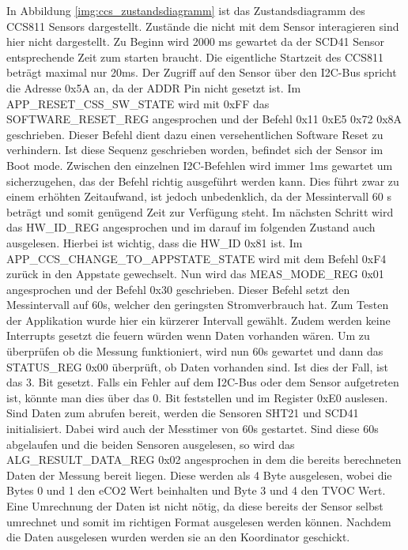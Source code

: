 \documentclass[]{article}
\begin{document}
			In Abbildung \ref{img:ccs_zustandsdiagramm} ist das Zustandsdiagramm des CCS811 Sensors dargestellt. Zustände die nicht mit dem Sensor interagieren sind hier nicht dargestellt. Zu Beginn wird 2000 ms gewartet da der SCD41 Sensor entsprechende Zeit zum starten braucht. Die eigentliche Startzeit des CCS811 beträgt maximal nur 20ms. Der Zugriff auf den Sensor über den I2C-Bus spricht die Adresse 0x5A an, da der ADDR Pin nicht gesetzt ist. Im APP\_RESET\_CSS\_SW\_STATE wird mit 0xFF das SOFTWARE\_RESET\_REG angesprochen und der Befehl 0x11 0xE5 0x72 0x8A geschrieben. Dieser Befehl dient dazu einen versehentlichen Software Reset zu verhindern. Ist diese Sequenz geschrieben worden, befindet sich der Sensor im Boot mode. Zwischen den einzelnen I2C-Befehlen wird immer 1ms gewartet um sicherzugehen, das der Befehl richtig ausgeführt werden kann. Dies führt zwar zu einem erhöhten Zeitaufwand, ist jedoch unbedenklich, da der Messintervall 60 s beträgt und somit genügend Zeit zur Verfügung steht. Im nächsten Schritt wird das HW\_ID\_REG angesprochen und im darauf im folgenden Zustand auch ausgelesen. Hierbei ist wichtig, dass die HW\_ID 0x81 ist. Im APP\_CCS\_CHANGE\_TO\_APPSTATE\_STATE wird mit dem Befehl 0xF4 zurück in den Appstate gewechselt. Nun wird das MEAS\_MODE\_REG 0x01 angesprochen und der Befehl 0x30 geschrieben. Dieser Befehl setzt den Messintervall auf 60s, welcher den geringsten Stromverbrauch hat. Zum Testen der Applikation wurde hier ein kürzerer Intervall gewählt. Zudem werden keine Interrupts gesetzt die feuern würden wenn Daten vorhanden wären. Um zu überprüfen ob die Messung funktioniert, wird nun 60s gewartet und dann das STATUS\_REG 0x00 überprüft, ob Daten vorhanden sind. Ist dies der Fall, ist das 3. Bit gesetzt. Falls ein Fehler auf dem I2C-Bus oder dem Sensor aufgetreten ist, könnte man dies über das 0. Bit feststellen und im Register 0xE0 auslesen. Sind Daten zum abrufen bereit, werden die Sensoren SHT21 und SCD41 initialisiert. Dabei wird auch der Messtimer von 60s gestartet. Sind diese 60s abgelaufen und die beiden Sensoren ausgelesen, so wird das ALG\_RESULT\_DATA\_REG 0x02 angesprochen in dem die bereits berechneten Daten der Messung bereit liegen. Diese werden als 4 Byte ausgelesen, wobei die Bytes 0 und 1 den eCO2 Wert beinhalten und Byte 3 und 4 den TVOC Wert. Eine Umrechnung der Daten ist nicht nötig, da diese bereits der Sensor selbst umrechnet und somit im richtigen Format ausgelesen werden können. Nachdem die Daten ausgelesen wurden werden sie an den Koordinator geschickt.
\end{document}

